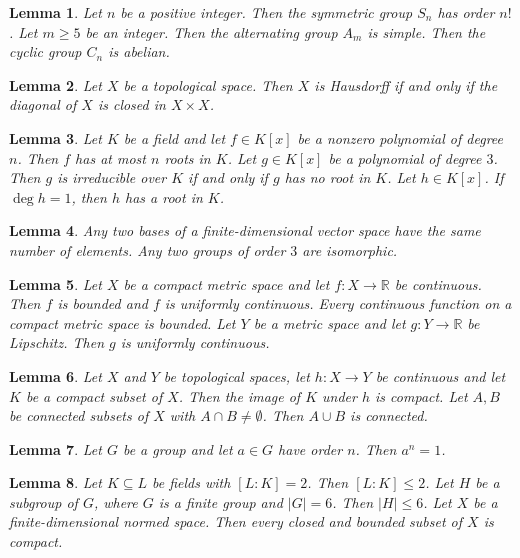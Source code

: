 \documentclass{article}
\newtheorem{lemma}{Lemma}
\begin{document}
\begin{lemma}\label{named-groups}
Let $n$ be a positive integer. Then the symmetric group $S_n$ has order $n!$. Let $m\ge5$ be an integer. Then the alternating group $A_m$ is simple. Then the cyclic group $C_n$ is abelian.
\end{lemma}

\begin{lemma}\label{diagonal}
Let $X$ be a topological space. Then $X$ is Hausdorff if and only if the diagonal of $X$ is closed in $X\times X$.
\end{lemma}

\begin{lemma}\label{polynomials}
Let $K$ be a field and let $f\in K[x]$ be a nonzero polynomial of degree $n$. Then $f$ has at most $n$ roots in $K$. Let $g\in K[x]$ be a polynomial of degree $3$. Then $g$ is irreducible over $K$ if and only if $g$ has no root in $K$. Let $h\in K[x]$. If $\deg h=1$, then $h$ has a root in $K$.
\end{lemma}

\begin{lemma}\label{any-two}
Any two bases of a finite-dimensional vector space have the same number of elements. Any two groups of order $3$ are isomorphic.
\end{lemma}

\begin{lemma}\label{real-functions-on-spaces}
Let $X$ be a compact metric space and let $f\colon X\to\mathbb{R}$ be continuous. Then $f$ is bounded and $f$ is uniformly continuous. Every continuous function on a compact metric space is bounded. Let $Y$ be a metric space and let $g\colon Y\to\mathbb{R}$ be Lipschitz. Then $g$ is uniformly continuous.
\end{lemma}

\begin{lemma}\label{images-and-unions}
Let $X$ and $Y$ be topological spaces, let $h\colon X\to Y$ be continuous and let $K$ be a compact subset of $X$. Then the image of $K$ under $h$ is compact. Let $A,B$ be connected subsets of $X$ with $A\cap B\neq\emptyset$. Then $A\cup B$ is connected.
\end{lemma}

\begin{lemma}\label{element-order}
Let $G$ be a group and let $a\in G$ have order $n$. Then $a^n=1$.
\end{lemma}

\begin{lemma}\label{chains-and-where}
Let $K\subseteq L$ be fields with $[L:K]=2$. Then $[L:K]\le2$. Let $H$ be a subgroup of $G$, where $G$ is a finite group and $|G|=6$. Then $|H|\le6$. Let $X$ be a finite-dimensional normed space. Then every closed and bounded subset of $X$ is compact.
\end{lemma}
\end{document}
